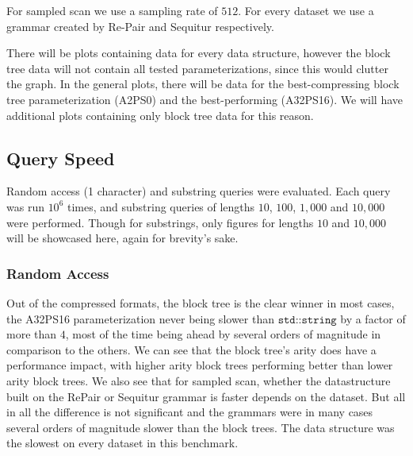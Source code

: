 \documentclass{scrartcl}
\begin{document}
For sampled scan we use a sampling rate of $512$.
For every dataset we use a grammar created by Re-Pair \cite{larsson_off-line_2000} and Sequitur \cite{nevill-manning_identifying_1997} respectively.

There will be plots containing data for every data structure, however the block tree data will not contain all tested parameterizations, since this would clutter the graph.
In the general plots, there will be data for the best-compressing block tree parameterization (A2PS0) and the best-performing (A32PS16).
We will have additional plots containing only block tree data for this reason.


\subsection{Query Speed}

Random access (1 character) and substring queries were evaluated.
Each query was run $10^6$ times, and substring queries of lengths $10$, $100$, $1,000$ and $10,000$ were performed.
Though for substrings, only figures for lengths $10$ and $10,000$ will be showcased here, again for brevity's sake.

\subsubsection{Random Access}

Out of the compressed formats, the block tree is the clear winner in most cases, the A32PS16 parameterization never being slower than $\texttt{std::string}$ by a factor of more than $4$,
most of the time being ahead by several orders of magnitude in comparison to the others.
We can see that the block tree's arity does have a performance impact, with higher arity block trees performing better than lower arity block trees.
We also see that for sampled scan, whether the datastructure built on the RePair or Sequitur grammar is faster depends on the dataset.
But all in all the difference is not significant and the grammars were in many cases several orders of magnitude slower than the block trees.
The \lzend{} data structure was the slowest on every dataset in this benchmark.
\end{document}
